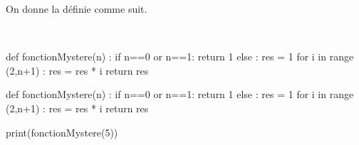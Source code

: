 On donne la  définie comme suit.
\begin{xxpy}~\\
\vspace{-1cm}
\begin{pyverbatim}
def fonctionMystere(n) :
    if n==0 or n==1:
         return 1
    else :
        res = 1
    for i in range (2,n+1) :
        res = res * i
    return res
\end{pyverbatim}
\end{xxpy}



\begin{pycode}
def fonctionMystere(n) :
    if n==0 or n==1:
         return 1
    else :
        res = 1
    for i in range (2,n+1) :
        res = res * i
    return res

print(fonctionMystere(5))
\end{pycode}


